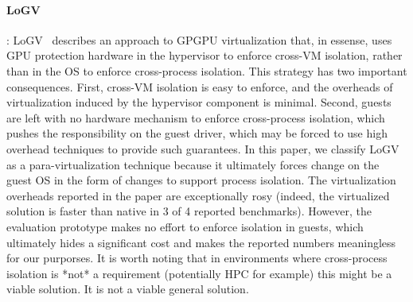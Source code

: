 \paragraph {\bf LoGV}: LoGV~\cite{LoGV} describes an approach to GPGPU virtualization that, in essense, uses
        GPU protection hardware in the hypervisor to enforce cross-VM isolation, rather than in the OS
        to enforce cross-process isolation. This strategy has two important consequences. First, cross-VM
        isolation is easy to enforce, and the overheads of virtualization induced by the hypervisor component
        is minimal. Second, guests are left with no hardware mechanism to enforce cross-process isolation,
        which pushes the responsibility on the guest driver, which may be forced to use high overhead
        techniques to provide such guarantees. In this paper, we classify LoGV as a para-virtualization technique
        because it ultimately forces change on the guest OS in the form of changes to support
        process isolation. The virtualization overheads reported in the paper are exceptionally rosy
        (indeed, the virtualized solution is faster than native in 3 of 4 reported benchmarks). However,
        the evaluation prototype makes no effort to enforce isolation in guests, which ultimately hides
        a significant cost and makes the reported numbers meaningless for our purporses. It is worth noting
        that in environments where cross-process isolation is *not* a requirement (potentially HPC for example)
        this might be a viable solution. It is not a viable general solution.

